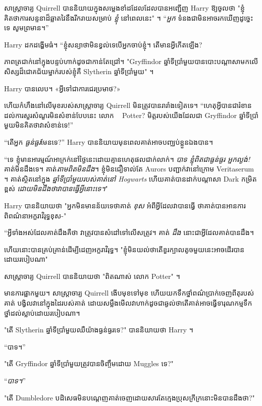 សាស្ត្រាចារ្យ Quirrell បាននិយាយក្នុងសម្លេងខាំដដែលដែលបានអញ្ជើញ Harry ឱ្យចូលថា "ខ្ញុំគិតថាការសន្ទនាដ៏ឆ្លាតវៃនឹងរីករាយសម្រាប់ \emph{ខ្ញុំ} នៅពេលនេះ" ។ “\emph{អ្នក} ទំនង​ជា​មិន​អាច​រក​ឃើញ​ដូច្នេះ​ទេ សូម​ព្រមាន។”

Harry ដកដង្ហើមធំ។ “ខ្ញុំ​សន្យា​ថា​មិន​ខ្វល់​ទេ​បើ​អ្នក​ចាប់​ខ្ញុំ។ តើមានអ្វីកើតឡើង?

ភាពត្រជាក់នៅក្នុងបន្ទប់ហាក់ដូចជាកាន់តែជ្រៅ។ "Gryffindor ឆ្នាំទីប្រាំមួយបានបោះបណ្តាសាមកលើសិស្សដ៏ជោគជ័យម្នាក់របស់ខ្ញុំគឺ Slytherin ឆ្នាំទីប្រាំមួយ" ។

Harry បានលេប។ «​អ្វី​ទៅ​ជា​ការ​ជេរ​ប្រមាថ​?»

ហើយកំហឹងនៅលើមុខរបស់សាស្រ្តាចារ្យ Quirrell មិនត្រូវបានរារាំងទៀតទេ។ “ហេតុ​អ្វី​បាន​ជា​រំខាន​ដល់​ការ​សួរ​សំណួរ​មិន​សំខាន់​បែប​នេះ លោក ~ Potter? មិត្តរបស់យើងដែលជា Gryffindor ឆ្នាំទីប្រាំមួយមិនគិតថាវាសំខាន់ទេ!”

“តើអ្នក \emph{ធ្ងន់ធ្ងរ}មែនទេ?” Harry បាននិយាយមុនពេលគាត់អាចបញ្ឈប់ខ្លួនឯងបាន។

“ទេ ខ្ញុំ​មាន​អារម្មណ៍​អាក្រក់​នៅ​ថ្ងៃ​នេះ​ដោយ​គ្មាន​ហេតុផល​ជាក់លាក់។ \emph{បាទ ខ្ញុំពិតជាធ្ងន់ធ្ងរ អ្នកល្ងង់!} គាត់មិនដឹងទេ។ គាត់\emph{តាមពិតមិនដឹង}។ ខ្ញុំមិនជឿទាល់តែ Aurors បញ្ជាក់វានៅក្រោម Veritaserum ។ គាត់ស្ថិតនៅក្នុង \emph{ឆ្នាំទីប្រាំមួយរបស់គាត់នៅ Hogwarts} ហើយគាត់បានដាក់បណ្តាសា Dark កម្រិតខ្ពស់ \emph{ដោយមិនដឹងថាវាបានធ្វើអ្វីនោះទេ។}"

Harry បាននិយាយថា "អ្នកមិនមានន័យទេថាគាត់ \emph{ខុស} អំពីអ្វីដែលវាបានធ្វើ ថាគាត់បានអានការពិពណ៌នាអក្ខរាវិរុទ្ធខុស-"

“អ្វីទាំងអស់ដែលគាត់ដឹងគឺថា វាត្រូវបានសំដៅទៅលើសត្រូវ។ គាត់ \emph{ដឹង} នោះជាអ្វីដែលគាត់បានដឹង។

ហើយនោះបានគ្រប់គ្រាន់ដើម្បីដេញអក្ខរាវិរុទ្ធ។ "ខ្ញុំមិនយល់ថាតើខួរក្បាលតូចមួយនេះអាចដើរបានដោយរបៀបណា"

សាស្រ្តាចារ្យ Quirrell បាននិយាយថា "ពិតណាស់ លោក Potter" ។

មានការផ្អាកមួយ។ សាស្រ្តាចារ្យ Quirrell ងើបមុខទៅមុខ ហើយយកទឹកថ្នាំពណ៌ប្រាក់ចេញពីតុរបស់គាត់ បង្វិលវានៅក្នុងដៃរបស់គាត់ ដោយសម្លឹងមើលវាហាក់ដូចជាឆ្ងល់ថាតើគាត់អាចធ្វើទារុណកម្មទឹកថ្នាំដល់ស្លាប់ដោយរបៀបណា។

"តើ Slytherin ឆ្នាំទីប្រាំមួយឈឺយ៉ាងធ្ងន់ធ្ងរទេ?" បាននិយាយថា Harry ។

“បាទ។”

"តើ Gryffindor ឆ្នាំទីប្រាំមួយត្រូវបានចិញ្ចឹមដោយ Muggles ទេ?"

“\emph{បាទ។}”

"តើ Dumbledore បដិសេធ​មិន​បណ្តេញ​គាត់​ចេញ​ដោយ​សារ​តែ​ក្មេង​ប្រុស​ក្រីក្រ​នោះ​មិន​បាន​ដឹង​ថា?"

